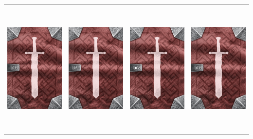 \documentclass{minimal}
\begin{document}
{\begin{longtable}{llll}
\includegraphics[width=44mm,height=68mm]{./29-35/gh-034-major-stamina-potion-back.png} &
\includegraphics[width=44mm,height=68mm]{./29-35/gh-034-major-stamina-potion-back.png} &
\includegraphics[width=44mm,height=68mm]{./29-35/gh-034-major-stamina-potion-back.png} &
\includegraphics[width=44mm,height=68mm]{./29-35/gh-034-major-stamina-potion-back.png}\\ 

\end{longtable}}
\end{document}
